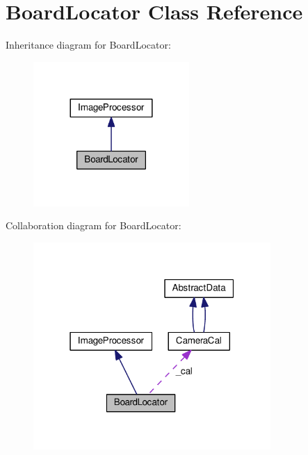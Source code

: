 \hypertarget{classBoardLocator}{}\section{Board\+Locator Class Reference}
\label{classBoardLocator}


Inheritance diagram for Board\+Locator\+:\nopagebreak
\begin{figure}[H]
\begin{center}
\leavevmode
\includegraphics[width=168pt]{classBoardLocator__inherit__graph}
\end{center}
\end{figure}


Collaboration diagram for Board\+Locator\+:\nopagebreak
\begin{figure}[H]
\begin{center}
\leavevmode
\includegraphics[width=256pt]{classBoardLocator__coll__graph}
\end{center}
\end{figure}
